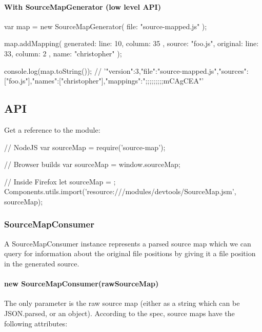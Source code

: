 \paragraph*{With Source\+Map\+Generator (low level A\+PI)}

\begin{DoxyVerb}var map = new SourceMapGenerator({
  file: "source-mapped.js"
});

map.addMapping({
  generated: {
    line: 10,
    column: 35
  },
  source: "foo.js",
  original: {
    line: 33,
    column: 2
  },
  name: "christopher"
});

console.log(map.toString());
// '{"version":3,"file":"source-mapped.js","sources":["foo.js"],"names":["christopher"],"mappings":";;;;;;;;;mCAgCEA"}'
\end{DoxyVerb}


\subsection*{A\+PI}

Get a reference to the module\+: \begin{DoxyVerb}// NodeJS
var sourceMap = require('source-map');

// Browser builds
var sourceMap = window.sourceMap;

// Inside Firefox
let sourceMap = {};
Components.utils.import('resource:///modules/devtools/SourceMap.jsm', sourceMap);
\end{DoxyVerb}


\subsubsection*{Source\+Map\+Consumer}

A Source\+Map\+Consumer instance represents a parsed source map which we can query for information about the original file positions by giving it a file position in the generated source.

\paragraph*{new Source\+Map\+Consumer(raw\+Source\+Map)}

The only parameter is the raw source map (either as a string which can be {\ttfamily J\+S\+O\+N.\+parse}\textquotesingle{}d, or an object). According to the spec, source maps have the following attributes\+:



